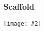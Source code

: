 \documentclass{beamer}
\newcommand{\plotslide}[2]{
  \begin{frame}
    \frametitle{#1}
    \texttt{[image: \#2]}
  \end{frame}
}
\begin{document}
\plotslide{Scaffold}{ScaffoldVsMAPKppMI.pdf}
\end{document}
